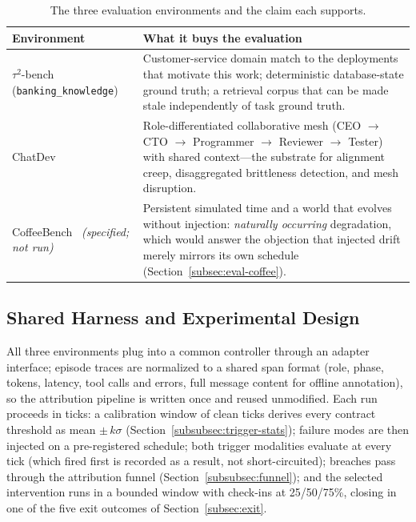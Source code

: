 \documentclass[conference]{IEEEtran}
\begin{document}
\begin{table}[t]
  \centering
  \caption{The three evaluation environments and the claim each supports.}
  \label{tab:environments}
  \footnotesize
  \begin{tabular}{@{}L{1.7cm}L{5.6cm}@{}}
    \toprule
    \textbf{Environment} & \textbf{What it buys the evaluation} \\
    \midrule
    $\tau^2$-bench (\texttt{banking\_knowledge})~\cite{barres2025tau2} &
    Customer-service domain match to the deployments that motivate this work;
    deterministic
    database-state ground truth; a retrieval corpus that can be made stale
    independently of task ground truth. \\
    \addlinespace
    ChatDev~\cite{qian2024chatdev} &
    Role-differentiated collaborative mesh (CEO $\to$ CTO $\to$ Programmer
    $\to$ Reviewer $\to$ Tester) with shared context---the substrate for
    alignment creep, disaggregated brittleness detection, and mesh
    disruption. \\
    \addlinespace
    CoffeeBench~\cite{sakana2026coffeebench} \emph{(specified; not run)} &
    Persistent simulated time and a world that evolves without injection:
    \emph{naturally occurring} degradation, which would answer the objection
    that injected drift merely mirrors its own schedule
    (Section~\ref{subsec:eval-coffee}). \\
    \bottomrule
  \end{tabular}
\end{table}

\subsection{Shared Harness and Experimental Design}
\label{subsec:eval-harness}

All three environments plug into a common controller through an adapter
interface; episode traces are normalized to a shared span format (role, phase,
tokens, latency, tool calls and errors, full message content for offline
annotation), so the attribution pipeline is written once and reused
unmodified. Each run proceeds in ticks: a calibration window of clean ticks
derives every contract threshold as mean $\pm\, k\sigma$
(Section~\ref{subsubsec:trigger-stats}); failure modes are then injected on a
pre-registered schedule; both trigger modalities evaluate at every tick (which
fired first is recorded as a result, not short-circuited); breaches pass
through the attribution funnel (Section~\ref{subsubsec:funnel}); and the
selected intervention runs in a bounded window with check-ins at 25/50/75\%,
closing in one of the five exit outcomes of Section~\ref{subsec:exit}.
\end{document}
